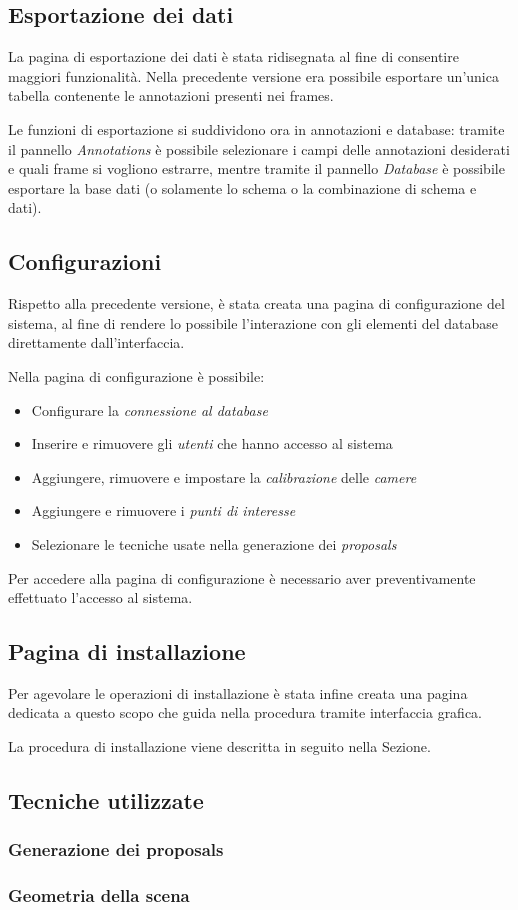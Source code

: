 \subsection{Esportazione dei dati}

La pagina di esportazione dei dati è stata ridisegnata al fine di consentire maggiori funzionalità. Nella precedente versione era possibile esportare un'unica tabella contenente le annotazioni presenti nei frames. 

Le funzioni di esportazione si suddividono ora in annotazioni e database: tramite il pannello \emph{Annotations} è possibile selezionare i campi delle annotazioni desiderati e quali frame si vogliono estrarre, mentre tramite il pannello \emph{Database} è possibile esportare la base dati (o solamente lo schema o la combinazione di schema e dati).

\subsection{Configurazioni}

Rispetto alla precedente versione, è stata creata una pagina di configurazione del sistema, al fine di rendere lo possibile l'interazione con gli elementi del database direttamente dall'interfaccia.

Nella pagina di configurazione è possibile:
\begin{itemize}
\item Configurare la \emph{connessione al database}
\item Inserire e rimuovere gli \emph{utenti} che hanno accesso al sistema
\item Aggiungere, rimuovere e impostare la \emph{calibrazione} delle \emph{camere}
\item Aggiungere e rimuovere i \emph{punti di interesse}
\item Selezionare le tecniche usate nella generazione dei \emph{proposals}
\end{itemize} 

Per accedere alla pagina di configurazione è necessario aver preventivamente effettuato l'accesso al sistema.


\subsection{Pagina di installazione}

Per agevolare le operazioni di installazione è stata infine creata una pagina dedicata a questo scopo che guida nella procedura tramite interfaccia grafica. 

La procedura di installazione viene descritta in seguito nella Sezione.

\subsection{Tecniche utilizzate}


\subsubsection{Generazione dei proposals}

\subsubsection{Geometria della scena}